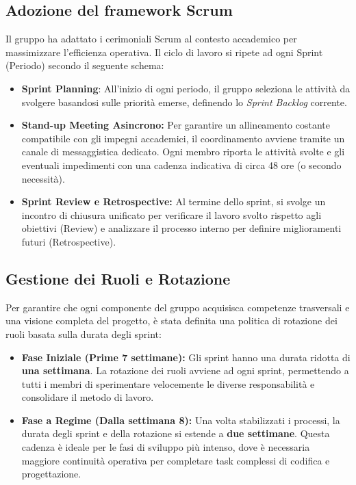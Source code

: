 \documentclass[a4paper, 11pt, oneside]{scrartcl} %
\begin{document}
\subsection{Adozione del framework Scrum}
Il gruppo ha adattato i cerimoniali Scrum al contesto accademico per massimizzare l'efficienza operativa. Il ciclo di lavoro si ripete ad ogni Sprint (Periodo) secondo il seguente schema:
\begin{itemize}
    \item \textbf{Sprint Planning}{\scriptsize{}}: All'inizio di ogni periodo, il gruppo seleziona le attività da svolgere basandosi sulle priorità emerse, definendo lo \textit{Sprint Backlog}{\scriptsize{}} corrente.
    \item \textbf{Stand-up Meeting Asincrono:} Per garantire un allineamento costante compatibile con gli impegni accademici, il coordinamento avviene tramite un canale di messaggistica dedicato. Ogni membro riporta le attività svolte e gli eventuali impedimenti con una cadenza indicativa di circa 48 ore (o secondo necessità).
    \item \textbf{Sprint Review{\scriptsize{}} e Retrospective{\scriptsize{}}:} Al termine dello sprint, si svolge un incontro di chiusura unificato per verificare il lavoro svolto rispetto agli obiettivi (Review) e analizzare il processo interno per definire miglioramenti futuri (Retrospective).
\end{itemize}

\subsection{Gestione dei Ruoli e Rotazione}
Per garantire che ogni componente del gruppo acquisisca competenze trasversali e una visione completa del progetto, è stata definita una politica di rotazione dei ruoli basata sulla durata degli sprint:
\begin{itemize}
    \item \textbf{Fase Iniziale (Prime 7 settimane):} Gli sprint hanno una durata ridotta di \textbf{una settimana}. La rotazione dei ruoli avviene ad ogni sprint, permettendo a tutti i membri di sperimentare velocemente le diverse responsabilità e consolidare il metodo di lavoro.
    \item \textbf{Fase a Regime (Dalla settimana 8):} Una volta stabilizzati i processi, la durata degli sprint e della rotazione si estende a \textbf{due settimane}. Questa cadenza è ideale per le fasi di sviluppo più intenso, dove è necessaria maggiore continuità operativa per completare task complessi di codifica e progettazione.
\end{itemize}
\end{document}
